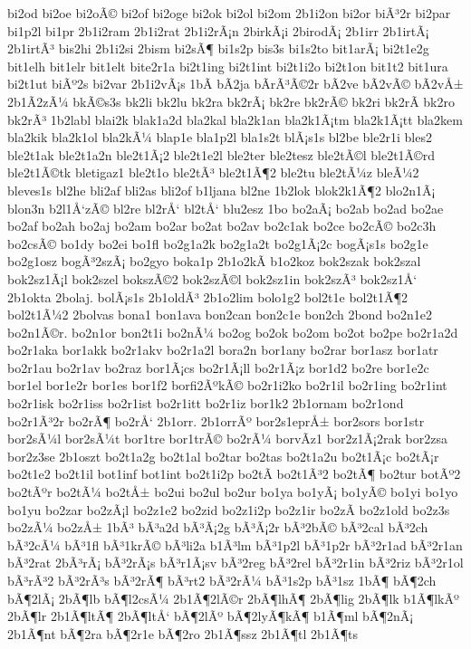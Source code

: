 {bi2od
bi2oe
bi2oÃ©
bi2of
bi2oge
bi2ok
bi2ol
bi2om
2b1i2on
bi2or
biÃ³2r
bi2par
bi1p2l
bi1pr
2b1i2ram
2b1i2rat
2b1i2rÃ¡n
2birkÃ¡i
2birodÃ¡
2b1irr
2b1irtÃ¡
2b1irtÃ³
bis2hi
2b1i2si
2bism
bi2sÃ¶
bi1s2p
bis3s
bi1s2to
bit1arÃ¡
bi2t1e2g
bit1elh
bit1elr
bit1elt
bite2r1a
bi2t1ing
bi2t1int
bi2t1i2o
bi2t1on
bit1t2
bit1ura
bi2t1ut
biÃº2s
bi2var
2b1i2vÃ¡s
1bÃ­
bÃ­2ja
bÃ­rÃ³Ã©2r
bÃ­2ve
bÃ­2vÃ©
bÃ­2vÅ±
2b1Ã­2zÃ¼
bkÃ©s3s
bk2li
bk2lu
bk2ra
bk2rÃ¡
bk2re
bk2rÃ©
bk2ri
bk2rÃ­
bk2ro
bk2rÃ³
1b2labl
blai2k
blak1a2d
bla2kal
bla2k1an
bla2k1Ã¡tm
bla2k1Ã¡tt
bla2kem
bla2kik
bla2k1ol
bla2kÃ¼
blap1e
bla1p2l
bla1s2t
blÃ¡s1s
bl2be
ble2r1i
bles2
ble2t1ak
ble2t1a2n
ble2t1Ã¡2
ble2t1e2l
ble2ter
ble2tesz
ble2tÃ©l
ble2t1Ã©rd
ble2t1Ã©tk
bletigaz1
ble2t1o
ble2tÃ³
ble2t1Ã¶2
ble2tu
ble2tÃ¼z
bleÃ¼2
bleves1s
bl2he
bli2af
bli2as
bli2of
b1ljana
bl2ne
1b2lok
blok2k1Ã¶2
blo2n1Ã¡
blon3n
b2l1Å‘zÃ©
bl2re
bl2rÅ‘
bl2tÅ‘
blu2esz
1bo
bo2aÃ¡
bo2ab
bo2ad
bo2ae
bo2af
bo2ah
bo2aj
bo2am
bo2ar
bo2at
bo2av
bo2c1ak
bo2ce
bo2cÃ©
bo2c3h
bo2csÃ©
bo1dy
bo2ei
bo1fl
bo2g1a2k
bo2g1a2t
bo2g1Ã¡2c
bogÃ¡s1s
bo2g1e
bo2g1osz
bogÃ³2szÃ¡
bo2gyo
boka1p
2b1o2kÃ­
b1o2koz
bok2szak
bok2szal
bok2sz1Ã¡l
bok2szel
bokszÃ©2
bok2szÃ©l
bok2sz1in
bok2szÃ³
bok2sz1Å‘
2b1okta
2bolaj.
bolÃ¡s1s
2b1oldÃ³
2b1o2lim
bolo1g2
bol2t1e
bol2t1Ã¶2
bol2t1Ã¼2
2bolvas
bona1
bon1ava
bon2can
bon2c1e
bon2ch
2bond
bo2n1e2
bo2n1Ã©r.
bo2n1or
bon2t1i
bo2nÃ¼
bo2og
bo2ok
bo2om
bo2ot
bo2pe
bo2r1a2d
bo2r1aka
bor1akk
bo2r1akv
bo2r1a2l
bora2n
bor1any
bo2rar
bor1asz
bor1atr
bo2r1au
bo2r1av
bo2raz
bor1Ã¡cs
bo2r1Ã¡ll
bo2r1Ã¡z
bor1d2
bo2re
bor1e2c
bor1el
bor1e2r
bor1es
bor1f2
borfi2ÃºkÃ©
bo2r1i2ko
bo2r1il
bo2r1ing
bo2r1int
bo2r1isk
bo2r1iss
bo2r1ist
bo2r1itt
bo2r1iz
bor1k2
2b1ornam
bo2r1ond
bo2r1Ã³2r
bo2rÃ¶
bo2rÅ‘
2b1orr.
2b1orrÃº
bor2s1eprÅ±
bor2sors
bor1str
bor2sÃ¼l
bor2sÃ¼t
bor1tre
bor1trÃ©
bo2rÃ¼
borvÃ­z1
bor2z1Ã¡2rak
bor2zsa
bor2z3se
2b1oszt
bo2t1a2g
bo2t1al
bo2tar
bo2tas
bo2t1a2u
bo2t1Ã¡c
bo2tÃ¡r
bo2t1e2
bo2t1il
bot1inf
bot1int
bo2t1i2p
bo2tÃ­
bo2t1Ã³2
bo2tÃ¶
bo2tur
botÃº2
bo2tÃºr
bo2tÃ¼
bo2tÅ±
bo2ui
bo2ul
bo2ur
bo1ya
bo1yÃ¡
bo1yÃ©
bo1yi
bo1yo
bo1yu
bo2zar
bo2zÃ¡l
bo2z1e2
bo2zid
bo2z1i2p
bo2z1ir
bo2zÃ­
bo2z1old
bo2z3s
bo2zÃ¼
bo2zÅ±
1bÃ³
bÃ³a2d
bÃ³Ã¡2g
bÃ³Ã¡2r
bÃ³2bÃ©
bÃ³2cal
bÃ³2ch
bÃ³2cÃ¼
bÃ³1fl
bÃ³1krÃ©
bÃ³li2a
b1Ã³lm
bÃ³1p2l
bÃ³1p2r
bÃ³2r1ad
bÃ³2r1an
bÃ³2rat
2bÃ³rÃ¡
bÃ³2rÃ¡s
bÃ³r1Ã¡sv
bÃ³2reg
bÃ³2rel
bÃ³2r1in
bÃ³2riz
bÃ³2r1ol
bÃ³rÃ³2
bÃ³2rÃ³s
bÃ³2rÃ¶
bÃ³rt2
bÃ³2rÃ¼
bÃ³1s2p
bÃ³1sz
1bÃ¶
bÃ¶2ch
bÃ¶2lÃ¡
2bÃ¶lb
bÃ¶l2csÃ¼
2b1Ã¶2lÃ©r
2bÃ¶lhÃ¶
2bÃ¶lig
2bÃ¶lk
b1Ã¶lkÃº
2bÃ¶lr
2b1Ã¶ltÃ¶
2bÃ¶ltÅ‘
bÃ¶2lÃº
bÃ¶2lyÃ¶kÃ¶
b1Ã¶ml
bÃ¶2nÃ¡
2b1Ã¶nt
bÃ¶2ra
bÃ¶2r1e
bÃ¶2ro
2b1Ã¶ssz
2b1Ã¶tl
2b1Ã¶ts
}
